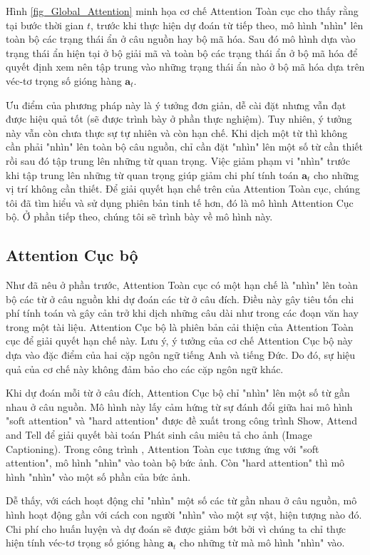 Hình \ref{fig_Global_Attention} minh họa cơ chế Attention Toàn cục cho thấy rằng tại bước thời gian $t$, trước khi thực hiện dự đoán từ tiếp theo, mô hình "nhìn" lên toàn bộ các trạng thái ẩn ở câu nguồn hay bộ mã hóa. Sau đó mô hình dựa vào trạng thái ẩn hiện tại ở bộ giải mã và toàn bộ các trạng thái ẩn ở bộ mã hóa để quyết định xem nên tập trung vào những trạng thái ẩn nào ở bộ mã hóa dựa trên véc-tơ trọng số gióng hàng $\bm{a}_t$.

Ưu điểm của phương pháp này là ý tưởng đơn giản, dễ cài đặt nhưng vẫn đạt được hiệu quả tốt (sẽ được trình bày ở phần thực nghiệm). Tuy nhiên, ý tưởng này vẫn còn chưa thực sự tự nhiên và còn hạn chế. Khi dịch một từ thì không cần phải "nhìn" lên toàn bộ câu nguồn, chỉ cần đặt "nhìn" lên một số từ cần thiết rồi sau đó tập trung lên những từ quan trọng. Việc giảm phạm vi "nhìn" trước khi tập trung lên những từ quan trọng giúp giảm chi phí tính toán $\bm{a}_t$ cho những vị trí không cần thiết. 
Để giải quyết hạn chế trên của Attention Toàn cục, chúng tôi đã tìm hiểu và sử dụng phiên bản tinh tế hơn, đó là mô hình Attention Cục bộ. Ở phần tiếp theo, chúng tôi sẽ trình bày về mô hình này.

\subsection{Attention Cục bộ}
Như đã nêu ở phần trước, Attention Toàn cục có một hạn chế là "nhìn" lên toàn bộ các từ ở câu nguồn khi dự đoán các từ ở câu đích. Điều này gây tiêu tốn chi phí tính toán và gây cản trở khi dịch những câu dài như trong các đoạn văn hay trong một tài liệu. Attention Cục bộ là phiên bản cải thiện của Attention Toàn cục để giải quyết hạn chế này. Lưu ý, ý tưởng của cơ chế Attention Cục bộ này dựa vào đặc điểm của hai cặp ngôn ngữ tiếng Anh và tiếng Đức. Do đó, sự hiệu quả của cơ chế này không đảm bảo cho các cặp ngôn ngữ khác.

Khi dự đoán mỗi từ ở câu đích, Attention Cục bộ chỉ "nhìn" lên một số từ gần nhau ở câu nguồn. Mô hình này lấy cảm hứng từ sự đánh đổi giữa hai mô hình "soft attention" và "hard attention" được đề xuất trong công trình Show, Attend and Tell \cite{showattendandtellXu2015} để giải quyết bài toán Phát sinh câu miêu tả cho ảnh (Image Captioning). Trong công trình \cite{showattendandtellXu2015}, Attention Toàn cục tương ứng với "soft attention", mô hình "nhìn" vào toàn bộ bức ảnh. Còn "hard attention" thì mô hình "nhìn" vào một số phần của bức ảnh.

Dễ thấy, với cách hoạt động chỉ "nhìn" một số các từ gần nhau ở câu nguồn, mô hình hoạt động gần với cách con người "nhìn" vào một sự vật, hiện tượng nào đó. Chi phí cho huấn luyện và dự đoán sẽ được giảm bớt bởi vì chúng ta chỉ thực hiện tính véc-tơ trọng số gióng hàng $\bm{a}_t$ cho những từ mà mô hình "nhìn" vào.

